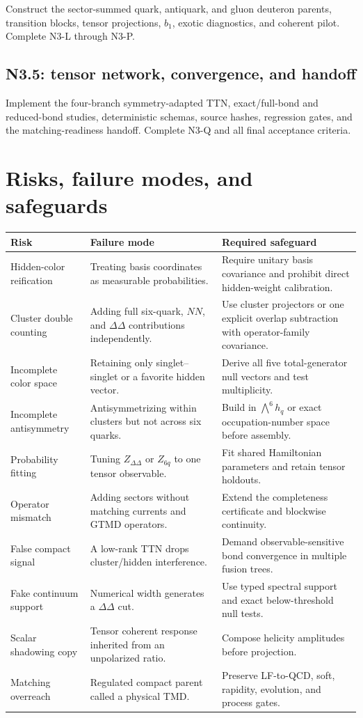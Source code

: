 \documentclass[11pt]{article}
\begin{document}
Construct the sector-summed quark, antiquark, and gluon deuteron parents, transition blocks, tensor projections, \(b_1\), exotic diagnostics, and coherent pilot.  Complete N3-L through N3-P.

\subsection{N3.5: tensor network, convergence, and handoff}

Implement the four-branch symmetry-adapted TTN, exact/full-bond and reduced-bond studies, deterministic schemas, source hashes, regression gates, and the matching-readiness handoff.  Complete N3-Q and all final acceptance criteria.

\section{Risks, failure modes, and safeguards}
\label{sec:risks}

\begin{longtable}{L{0.24\textwidth}L{0.34\textwidth}L{0.34\textwidth}}
\toprule
Risk & Failure mode & Required safeguard \\
\midrule
\endhead
Hidden-color reification & Treating basis coordinates as measurable probabilities. & Require unitary basis covariance and prohibit direct hidden-weight calibration. \\
Cluster double counting & Adding full six-quark, \(NN\), and \(\Delta\Delta\) contributions independently. & Use cluster projectors or one explicit overlap subtraction with operator-family covariance. \\
Incomplete color space & Retaining only singlet--singlet or a favorite hidden vector. & Derive all five total-generator null vectors and test multiplicity. \\
Incomplete antisymmetry & Antisymmetrizing within clusters but not across six quarks. & Build in \(\bigwedge^6h_q\) or exact occupation-number space before assembly. \\
Probability fitting & Tuning \(Z_{\Delta\Delta}\) or \(Z_{6q}\) to one tensor observable. & Fit shared Hamiltonian parameters and retain tensor holdouts. \\
Operator mismatch & Adding sectors without matching currents and GTMD operators. & Extend the completeness certificate and blockwise continuity. \\
False compact signal & A low-rank TTN drops cluster/hidden interference. & Demand observable-sensitive bond convergence in multiple fusion trees. \\
Fake continuum support & Numerical width generates a \(\Delta\Delta\) cut. & Use typed spectral support and exact below-threshold null tests. \\
Scalar shadowing copy & Tensor coherent response inherited from an unpolarized ratio. & Compose helicity amplitudes before projection. \\
Matching overreach & Regulated compact parent called a physical TMD. & Preserve LF-to-QCD, soft, rapidity, evolution, and process gates. \\
\bottomrule
\end{longtable}
\end{document}
